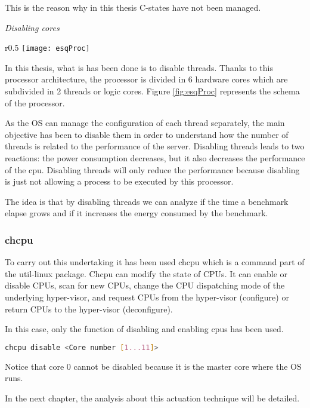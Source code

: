 This is the reason why in this thesis C-states have not been managed.

\emph{Disabling cores}


\begin{wrapfigure}{r}{0.5\textwidth}
    \centering
    \texttt{[image: esqProc]}
    \caption{Schema of a typical 6 core processor}
    \label{fig:esqProc} %
\end{wrapfigure}

In this thesis, what is has been done is to disable threads. Thanks to this processor architecture, the processor is divided in 6 hardware cores which are subdivided in 2 threads or logic cores. Figure \ref{fig:esqProc} represents the schema of the processor.

As the OS can manage the configuration of each thread separately, the main objective has been to disable them in order to understand how the number of threads is related to the performance of the server. Disabling threads leads to two reactions: the power consumption decreases, but it also decreases the performance of the cpu. Disabling threads will only reduce the performance because disabling is just not allowing a process to be executed by this processor.

The idea is that by disabling threads we can analyze if the time a benchmark elapse grows and if it increases the energy consumed by the benchmark. 

\subsubsection{chcpu}

To carry out this undertaking it has been used chcpu which is a command part of the util-linux package. Chcpu can modify the state of CPUs. It can enable or disable CPUs, scan for new CPUs, change the CPU dispatching mode of the underlying hyper-visor, and request CPUs from the hyper-visor (configure) or return CPUs to the hyper-visor (deconfigure).

In this case, only the function of disabling and enabling cpus has been used.

\begin{lstlisting}[language=Bash]
chcpu disable <Core number [1...11]>
\end{lstlisting}

Notice that core 0 cannot be disabled because it is the master core where the OS runs.

In the next chapter, the analysis about this actuation technique will be detailed.

